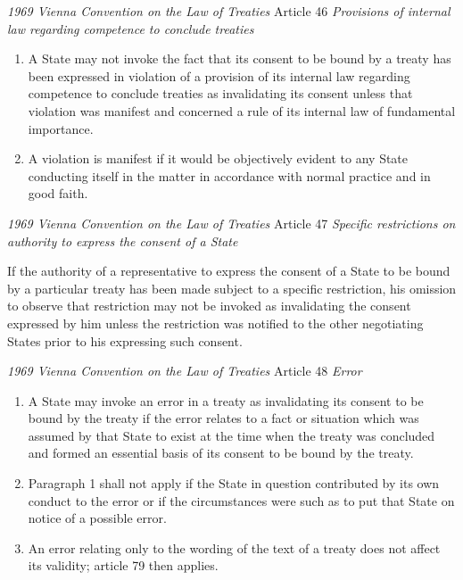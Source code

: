 \begin{conventiondetails}{\textit{1969 Vienna Convention on the Law of Treaties} Article 46}\label{VCLT Art 46}
    \flushleft
    \textit{Provisions of internal law regarding competence to conclude treaties}

    \begin{enumerate}
        \item A State may not invoke the fact that its consent to be bound by a treaty has been expressed in violation of a provision of its internal law regarding competence to conclude treaties as invalidating its consent unless that violation was manifest and concerned a rule of its internal law of fundamental importance. 
        \item A violation is manifest if it would be objectively evident to any State conducting itself in the matter in accordance with normal practice and in good faith.
    \end{enumerate}
\end{conventiondetails}

\begin{conventiondetails}{\textit{1969 Vienna Convention on the Law of Treaties} Article 47}\label{VCLT Art 47}
    \flushleft
    \textit{Specific restrictions on authority to express the consent of a State}

    \vspace{\baselineskip}

    If the authority of a representative to express the consent of a State to be bound by a particular treaty has been made subject to a specific restriction, his omission to observe that restriction may not be invoked as invalidating the consent expressed by him unless the restriction was notified to the other negotiating States prior to his expressing such consent.
\end{conventiondetails}

\begin{conventiondetails}{\textit{1969 Vienna Convention on the Law of Treaties} Article 48}\label{VCLT Art 48}
    \flushleft
    \textit{Error}

    \begin{enumerate}
        \item A State may invoke an error in a treaty as invalidating its consent to be bound by the treaty if the error relates to a fact or situation which was assumed by that State to exist at the time when the treaty was concluded and formed an essential basis of its consent to be bound by the treaty. 
        \item Paragraph 1 shall not apply if the State in question contributed by its own conduct to the error or if the circumstances were such as to put that State on notice of a possible error. 
        \item An error relating only to the wording of the text of a treaty does not affect its validity; article 79 then applies.
    \end{enumerate}
\end{conventiondetails}

